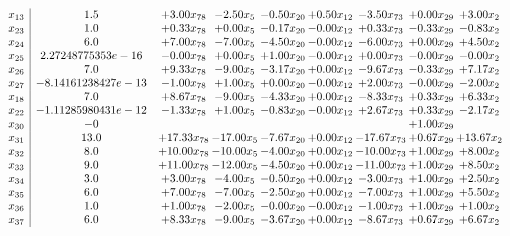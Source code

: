 \documentclass[8pt]{article}
\begin{document}
\[\begin{array}{c| c c@{\hskip 2pt} c@{\hskip 2pt} c@{\hskip 2pt} c@{\hskip 2pt} c@{\hskip 2pt} c@{\hskip 2pt} c@{\hskip 2pt} }
 x_{13}   &  1.5 & +  3.00 x_{78} & -2.50 x_{5} & -0.50 x_{20} & +  0.50 x_{12} & -3.50 x_{73} & +  0.00 x_{29} & +  3.00 x_{2}\\
 x_{23}   &  1.0 & +  0.33 x_{78} & +  0.00 x_{5} & -0.17 x_{20} & -0.00 x_{12} & +  0.33 x_{73} & -0.33 x_{29} & -0.83 x_{2}\\
 x_{24}   &  6.0 & +  7.00 x_{78} & -7.00 x_{5} & -4.50 x_{20} & -0.00 x_{12} & -6.00 x_{73} & +  0.00 x_{29} & +  4.50 x_{2}\\
 x_{25}   &  2.27248775353e-16 & -0.00 x_{78} & +  0.00 x_{5} & +  1.00 x_{20} & -0.00 x_{12} & +  0.00 x_{73} & -0.00 x_{29} & -0.00 x_{2}\\
 x_{26}   &  7.0 & +  9.33 x_{78} & -9.00 x_{5} & -3.17 x_{20} & +  0.00 x_{12} & -9.67 x_{73} & -0.33 x_{29} & +  7.17 x_{2}\\
 x_{27}   &  -8.14161238427e-13 & -1.00 x_{78} & +  1.00 x_{5} & +  0.00 x_{20} & -0.00 x_{12} & +  2.00 x_{73} & -0.00 x_{29} & -2.00 x_{2}\\
 x_{18}   &  7.0 & +  8.67 x_{78} & -9.00 x_{5} & -4.33 x_{20} & +  0.00 x_{12} & -8.33 x_{73} & +  0.33 x_{29} & +  6.33 x_{2}\\
 x_{22}   &  -1.11285980431e-12 & -1.33 x_{78} & +  1.00 x_{5} & -0.83 x_{20} & -0.00 x_{12} & +  2.67 x_{73} & +  0.33 x_{29} & -2.17 x_{2}\\
 x_{30}   &  -0  &    &    &    &    &   & +  1.00 x_{29} &   \\
 x_{31}   &  13.0 & + 17.33 x_{78} & -17.00 x_{5} & -7.67 x_{20} & +  0.00 x_{12} & -17.67 x_{73} & +  0.67 x_{29} & + 13.67 x_{2}\\
 x_{32}   &  8.0 & + 10.00 x_{78} & -10.00 x_{5} & -4.00 x_{20} & +  0.00 x_{12} & -10.00 x_{73} & +  1.00 x_{29} & +  8.00 x_{2}\\
 x_{33}   &  9.0 & + 11.00 x_{78} & -12.00 x_{5} & -4.50 x_{20} & +  0.00 x_{12} & -11.00 x_{73} & +  1.00 x_{29} & +  8.50 x_{2}\\
 x_{34}   &  3.0 & +  3.00 x_{78} & -4.00 x_{5} & -0.50 x_{20} & +  0.00 x_{12} & -3.00 x_{73} & +  1.00 x_{29} & +  2.50 x_{2}\\
 x_{35}   &  6.0 & +  7.00 x_{78} & -7.00 x_{5} & -2.50 x_{20} & +  0.00 x_{12} & -7.00 x_{73} & +  1.00 x_{29} & +  5.50 x_{2}\\
 x_{36}   &  1.0 & +  1.00 x_{78} & -2.00 x_{5} & -0.00 x_{20} & -0.00 x_{12} & -1.00 x_{73} & +  1.00 x_{29} & +  1.00 x_{2}\\
 x_{37}   &  6.0 & +  8.33 x_{78} & -9.00 x_{5} & -3.67 x_{20} & +  0.00 x_{12} & -8.67 x_{73} & +  0.67 x_{29} & +  6.67 x_{2}\\

\end{array}\]
\end{document}
